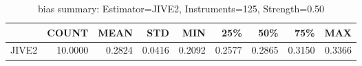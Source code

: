 \begin{table}[ht]
\centering
\caption{bias summary: Estimator=JIVE2, Instruments=125, Strength=0.50}
\begin{tabular}{lrrrrrrrr}
\toprule
 & COUNT & MEAN & STD & MIN & 25\% & 50\% & 75\% & MAX \\
\midrule
JIVE2 & 10.0000 & 0.2824 & 0.0416 & 0.2092 & 0.2577 & 0.2865 & 0.3150 & 0.3366 \\
\bottomrule
\end{tabular}
\end{table}
